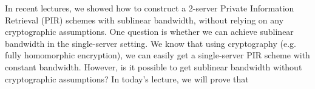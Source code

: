 
\newcommand{\bits}{\{0,1\}}
\newcommand{\bfu}{\mathbf{u}}
\newcommand{\bfv}{\mathbf{v}}
\newcommand{\bfp}{\mathbf{p}}
\newcommand{\bfz}{\mathbf{z}}
\newcommand{\bfx}{\mathbf{x}}
\newcommand{\bfy}{\mathbf{y}}

\newcommand{\calR}{\mathcal{R}}
\newcommand{\FHE}{\ensuremath{{\sf FHE}}}
\newcommand{\Gen}{\ensuremath{{\sf Gen}}}
\newcommand{\Eval}{\ensuremath{{\sf Eval}}}
\newcommand{\Enc}{\ensuremath{{\sf Enc}}}
\newcommand{\Dec}{\ensuremath{{\sf Dec}}}
\newcommand{\DB}{\ensuremath{{\sf DB}}}

\newcommand{\CNextMsg}{\ensuremath{{\sf C Next Msg}}}
\newcommand{\SNextMsg}{\ensuremath{{\sf S Next Msg}}}
\newcommand{\CNext}{\ensuremath{{\sf C Next}}}
\newcommand{\SNext}{\ensuremath{{\sf S Next}}}
\newcommand{\Cstp}{\ensuremath{{\sf Cst'}}}
\newcommand{\Cst}{\ensuremath{{\sf Cst}}}
\newcommand{\msg}{\ensuremath{{\sf msg}}}
\newcommand{\msgp}{\ensuremath{{\sf msg'}}}
\newcommand{\Coutput}{\ensuremath{{\sf Reconstr}}}
\newcommand{\ans}{\ensuremath{{\sf ans}}}
\newcommand{\Ccoins}{\ensuremath{{\sf Ccoins}}}
\newcommand{\Scoins}{\ensuremath{{\sf Scoins}}}
\newcommand{\Comm}{\ensuremath{{\sf Comm}}}
\newcommand{\Expt}{\ensuremath{{\sf Expt}}}
\newcommand{\coin}{\ensuremath{{\sf coin}}}
\newcommand{\View}{\ensuremath{{\sf View}}}
\newcommand{\negl}{\ensuremath{{\sf negl}}}
\newcommand{\PPT}{PPT }
\newcommand{\Out}{\ensuremath{{\sf Out}}}
\newcommand{\OWF}{\ensuremath{{\sf OWF}}}
\newcommand{\OT}{\ensuremath{{\sf OT}}}
\newcommand{\PIR}{\ensuremath{{\sf PIR}}}
\newcommand{\Server}{\ensuremath{{\sf Server}}}
\newcommand{\Client}{\ensuremath{{\sf Client}}}
\newcommand{\Alice}{\ensuremath{{\sf Alice}}}
\newcommand{\Bob}{\ensuremath{{\sf Bob}}}
\newcommand{\getr}{\ensuremath{~{\overset{\$}{\leftarrow}}}~}
\newcommand{\get}{\ensuremath{\leftarrow}}
\newcommand{\E}{\ensuremath{{\bf E}}}
\newcommand{\out}{\ensuremath{{\sf out}}}

\newcommand{\ignore}[1]{}




In recent lectures, we showed how to construct a 2-server Private Information Retrieval (PIR) schemes with sublinear bandwidth, without relying on any cryptographic assumptions. 
One question is whether we can achieve sublinear bandwidth in the single-server setting.
We know that using cryptography (e.g. fully homomorphic encryption), we can 
easily get a single-server PIR scheme with constant bandwidth. 
However, is it possible to get sublinear bandwidth without cryptographic assumptions?
In today's lecture, we will prove that 

